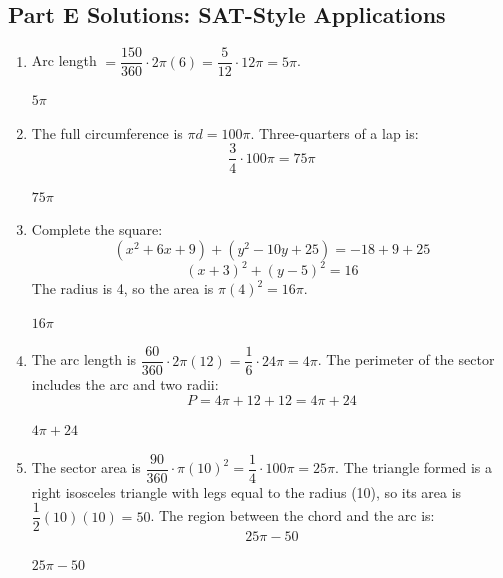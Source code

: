 \documentclass[14pt]{extarticle}
\begin{document}
\subsection*{Part E Solutions: SAT-Style Applications}
\begin{enumerate}
  \item Arc length \(= \dfrac{150}{360} \cdot 2\pi(6) = \dfrac{5}{12} \cdot 12\pi = 5\pi\).

  \(\boxed{5\pi}\)

  \item The full circumference is \(\pi d = 100\pi\). Three-quarters of a lap is:
  \[
  \frac{3}{4} \cdot 100\pi = 75\pi
  \]

  \(\boxed{75\pi}\)

  \item Complete the square:
  \[
  (x^2 + 6x + 9) + (y^2 - 10y + 25) = -18 + 9 + 25
  \]
  \[
  (x + 3)^2 + (y - 5)^2 = 16
  \]
  The radius is 4, so the area is \(\pi(4)^2 = 16\pi\).

  \(\boxed{16\pi}\)

  \item The arc length is \(\dfrac{60}{360} \cdot 2\pi(12) = \dfrac{1}{6} \cdot 24\pi = 4\pi\). The perimeter of the sector includes the arc and two radii:
  \[
  P = 4\pi + 12 + 12 = 4\pi + 24
  \]

  \(\boxed{4\pi + 24}\)

  \item The sector area is \(\dfrac{90}{360} \cdot \pi(10)^2 = \dfrac{1}{4} \cdot 100\pi = 25\pi\). The triangle formed is a right isosceles triangle with legs equal to the radius (10), so its area is \(\dfrac{1}{2}(10)(10) = 50\). The region between the chord and the arc is:
  \[
  25\pi - 50
  \]

  \(\boxed{25\pi - 50}\)
\end{enumerate}

\end{document}
